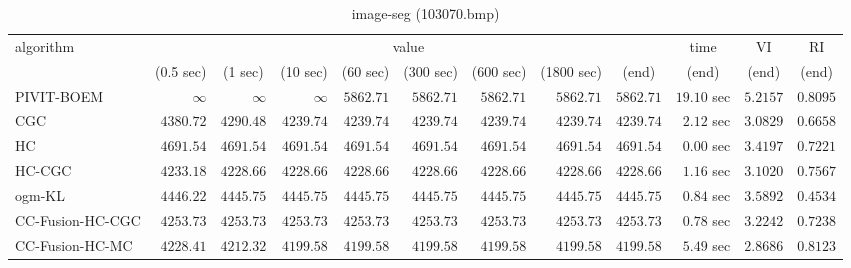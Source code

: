 \begin{table}[H]
\scriptsize
\centering
\caption{image-seg (103070.bmp)}
\label{tab:anytimetable-image-seg-103070.bmp}
\begin{tabular}{lrrrrrrrrrrr}
\toprule
           algorithm &                                   \multicolumn{8}{c}{value} & \multicolumn{1}{c}{time}    & \multicolumn{1}{c}{VI}  & \multicolumn{1}{c}{RI} \\  
\cmidrule(lr){2-9}\cmidrule(lr){10-10} \cmidrule(lr){11-11} \cmidrule(lr){12-12}   
                     & \multicolumn{1}{c}{(0.5 sec)} & \multicolumn{1}{c}{(1 sec)} & \multicolumn{1}{c}{(10 sec)} & \multicolumn{1}{c}{(60 sec)} & \multicolumn{1}{c}{(300 sec)} & \multicolumn{1}{c}{(600 sec)} & \multicolumn{1}{c}{(1800 sec)} & \multicolumn{1}{c}{(end)} & \multicolumn{1}{c}{(end)}    & \multicolumn{1}{c}{(end)}   & \multicolumn{1}{c}{(end)}  \\ \midrule 
          PIVIT-BOEM & $\infty$ & $\infty$ & $\infty$ & $      5862.71$ & $      5862.71$ & $      5862.71$ & $      5862.71$ & $      5862.71$ & $        19.10$ sec    & $       5.2157$  & $       0.8095$ \\ 
                 CGC & $      4380.72$ & $      4290.48$ & $      4239.74$ & $      4239.74$ & $      4239.74$ & $      4239.74$ & $      4239.74$ & $      4239.74$ & $         2.12$ sec    & $       3.0829$  & $       0.6658$ \\ 
                  HC & $      4691.54$ & $      4691.54$ & $      4691.54$ & $      4691.54$ & $      4691.54$ & $      4691.54$ & $      4691.54$ & $      4691.54$ & $         0.00$ sec    & $       3.4197$  & $       0.7221$ \\ 
              HC-CGC & $      4233.18$ & $      4228.66$ & $      4228.66$ & $      4228.66$ & $      4228.66$ & $      4228.66$ & $      4228.66$ & $      4228.66$ & $         1.16$ sec    & $       3.1020$  & $       0.7567$ \\ 
              ogm-KL & $      4446.22$ & $      4445.75$ & $      4445.75$ & $      4445.75$ & $      4445.75$ & $      4445.75$ & $      4445.75$ & $      4445.75$ & $         0.84$ sec    & $       3.5892$  & $       0.4534$ \\ 
    CC-Fusion-HC-CGC & $      4253.73$ & $      4253.73$ & $      4253.73$ & $      4253.73$ & $      4253.73$ & $      4253.73$ & $      4253.73$ & $      4253.73$ & $         0.78$ sec    & $       3.2242$  & $       0.7238$ \\ 
     CC-Fusion-HC-MC & $      4228.41$ & $      4212.32$ & $      4199.58$ & $      4199.58$ & $      4199.58$ & $      4199.58$ & $      4199.58$ & $      4199.58$ & $         5.49$ sec    & $       2.8686$  & $       0.8123$ \\ 

\end{tabular}
\end{table}
